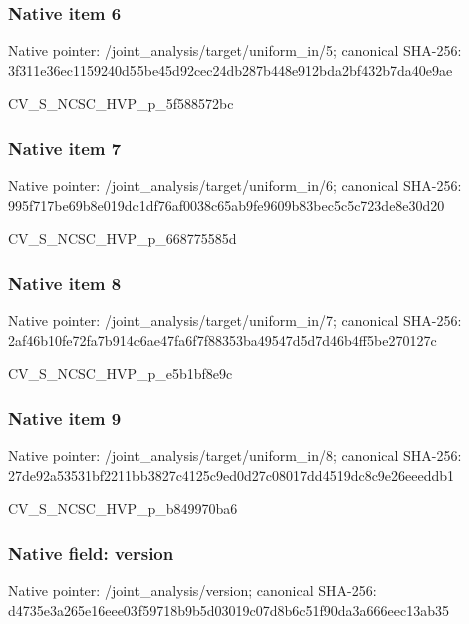 \documentclass[10pt,a4paper]{article}
\begin{document}
\subsubsection{Native item 6}
Native pointer: /joint\_\allowbreak{}analysis/target/uniform\_\allowbreak{}in/5; canonical SHA-256: 3f311e36ec1159240d55be45d92cec24db287b448e912bda2bf432b7da40e9ae

\begingroup\raggedright\sloppy CV\_\allowbreak{}S\_\allowbreak{}NCSC\_\allowbreak{}HVP\_\allowbreak{}p\_\allowbreak{}5f588572bc\par\endgroup

\subsubsection{Native item 7}
Native pointer: /joint\_\allowbreak{}analysis/target/uniform\_\allowbreak{}in/6; canonical SHA-256: 995f717be69b8e019dc1df76af0038c65ab9fe9609b83bec5c5c723de8e30d20

\begingroup\raggedright\sloppy CV\_\allowbreak{}S\_\allowbreak{}NCSC\_\allowbreak{}HVP\_\allowbreak{}p\_\allowbreak{}668775585d\par\endgroup

\subsubsection{Native item 8}
Native pointer: /joint\_\allowbreak{}analysis/target/uniform\_\allowbreak{}in/7; canonical SHA-256: 2af46b10fe72fa7b914c6ae47fa6f7f88353ba49547d5d7d46b4ff5be270127c

\begingroup\raggedright\sloppy CV\_\allowbreak{}S\_\allowbreak{}NCSC\_\allowbreak{}HVP\_\allowbreak{}p\_\allowbreak{}e5b1bf8e9c\par\endgroup

\subsubsection{Native item 9}
Native pointer: /joint\_\allowbreak{}analysis/target/uniform\_\allowbreak{}in/8; canonical SHA-256: 27de92a53531bf2211bb3827c4125c9ed0d27c08017dd4519dc8c9e26eeeddb1

\begingroup\raggedright\sloppy CV\_\allowbreak{}S\_\allowbreak{}NCSC\_\allowbreak{}HVP\_\allowbreak{}p\_\allowbreak{}b849970ba6\par\endgroup

\subsubsection{Native field: version}
Native pointer: /joint\_\allowbreak{}analysis/version; canonical SHA-256: d4735e3a265e16eee03f59718b9b5d03019c07d8b6c51f90da3a666eec13ab35
\end{document}
